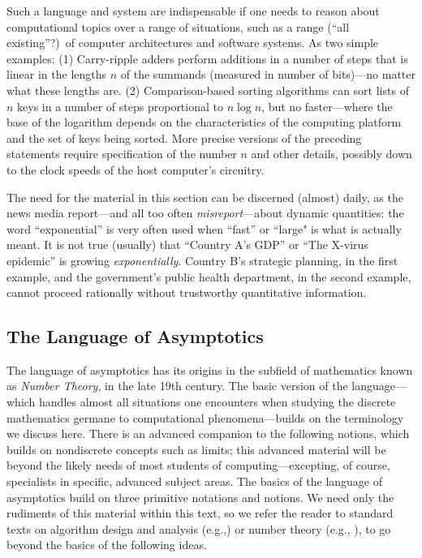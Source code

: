 Such a language and system are indispensable if one needs to reason about computational topics over a range of situations, such as a range (``all existing''?)~of computer architectures and software systems.  As two simple examples: (1) Carry-ripple adders perform additions in a number of steps that is linear in the lengths $n$ of the summands (measured in number of bits)---no matter what these lengths are.  (2) Comparison-based sorting algorithms can sort lists of $n$ keys in a number of steps proportional to $n \log n$, but no faster---where the base of the logarithm depends on the characteristics of the computing platform and the set of keys being sorted.  More precise versions of the preceding statements require specification of the number $n$ and other details, possibly down to the clock speeds of the host computer's circuitry.

\smallskip

The need for the material in this section can be discerned (almost) daily, as the news media report---and all too often {\em misreport}---about dynamic quantities: the word ``exponential'' is
very often used when ``fast'' or ``large" is what is actually meant.  It is not true (usually) that ``Country A's GDP'' or ``The X-virus epidemic'' is growing {\em exponentially}.  Country B's strategic planning, in the first example, and the government's public health department, in the second example, cannot proceed rationally without trustworthy quantitative information.

\subsection{The Language of Asymptotics}
\label{sec:language-asymptotics}

The language of asymptotics has its origins in the subfield of mathematics known as {\it Number Theory}, in the late 19th century.  The basic version of the language---which handles almost all situations one encounters when studying the discrete mathematics germane to computational phenomena---builds on the terminology we discuss here.  There is an advanced companion to the following notions, which builds on nondiscrete concepts such as limits; this advanced material will be beyond the likely needs of most students of computing---excepting, of course, specialists in specific, advanced subject areas.  The basics of the language of asymptotics build on three primitive notations and notions.  We need only the rudiments of this material within this text, so we refer the reader to standard texts on algorithm design and analysis (e.g.,\cite{CLRS}) or number theory (e.g., \cite{NivenZ80}), to go beyond the basics of the following ideas.

